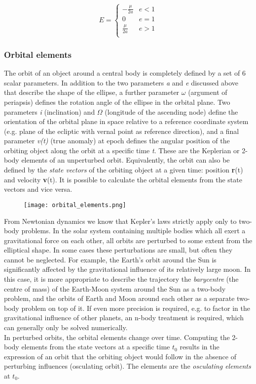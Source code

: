 \documentclass[Orbiter User Manual.tex]{subfiles}
\begin{document}
\[ E =
\left\{
\begin{array}{ll}
	-\frac{\mu}{2a} & e < 1 \\
	0 & e = 1 \\
	\frac{\mu}{2a} & e > 1 \\
\end{array} 
\right. \]

\subsubsection{Orbital elements}
The orbit of an object around a central body is completely defined by a set of 6 scalar parameters. In addition to the two parameters \textit{a} and \textit{e} discussed above that describe the shape of the ellipse, a further parameter $\omega$ (argument of periapsis) defines the rotation angle of the ellipse in the orbital plane. Two parameters \textit{i} (inclination) and $\Omega$ (longitude of the ascending node) define the orientation of the orbital plane in space relative to a reference coordinate system (e.g. plane of the ecliptic with vernal point {\Aries} as reference direction), and a final parameter \textit{v(t)} (true anomaly) at epoch defines the angular position of the orbiting object along the orbit at a specific time \textit{t}. These are the Keplerian or 2-body elements of an unperturbed orbit. Equivalently, the orbit can also be defined by the \textit{state vectors} of the orbiting object at a given time: position \textbf{r}(t) and velocity \textbf{v}(t). It is possible to calculate the orbital elements from the state vectors and vice versa.

\begin{figure}[H]
	\centering
	\texttt{[image: orbital\_elements.png]}
\end{figure}

\noindent
From Newtonian dynamics we know that Kepler's laws strictly apply only to two-body problems. In the solar system containing multiple bodies which all exert a gravitational force on each other, all orbits are perturbed to some extent from the elliptical shape. In some cases these perturbations are small, but often they cannot be neglected. For example, the Earth's orbit around the Sun is significantly affected by the gravitational influence of its relatively large moon. In this case, it is more appropriate to describe the trajectory the \textit{barycentre} (the centre of mass) of the Earth-Moon system around the Sun as a two-body problem, and the orbits of Earth and Moon around each other as a separate two-body problem on top of it. If even more precision is required, e.g. to factor in the gravitational influence of other planets, an n-body treatment is required, which can generally only be solved numerically.\\
In perturbed orbits, the orbital elements change over time. Computing the 2-body elements from the state vectors at a specific time $t_{0}$ results in the expression of an orbit that the orbiting object would follow in the absence of perturbing influences (osculating orbit). The elements are the \textit{osculating elements} at $t_{0}$.
\end{document}
